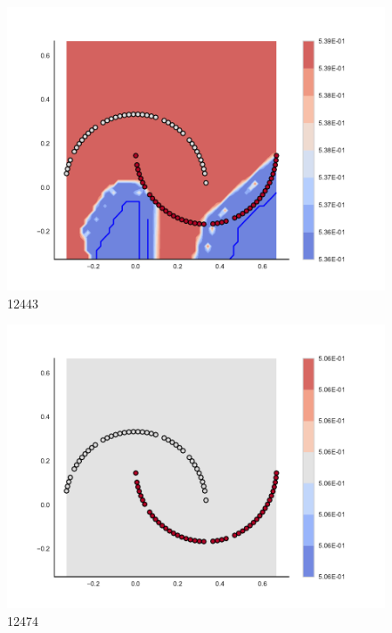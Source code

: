 \begin{subfigure}[b]{0.09\textwidth}
    \includegraphics[width=\textwidth]{img/convergence/12443.pdf}
    \caption{12443}
    \label{fig:convergence_12443}
\end{subfigure}
%
\begin{subfigure}[b]{0.09\textwidth}
    \includegraphics[width=\textwidth]{img/convergence/12474.pdf}
    \caption{12474}
    \label{fig:convergence_12474}
\end{subfigure}
%
